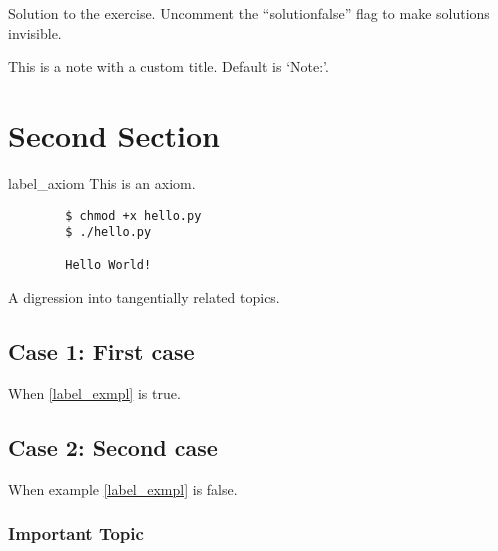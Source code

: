 \documentclass{worksheet}
\begin{document}
    
    \begin{solution}
    Solution to the exercise. Uncomment the ``solutionfalse'' flag to make solutions invisible.
    \end{solution}
    
    
    \begin{note}
	This is a note with a custom title. Default is `Note:'.
	\end{note}
	

    
	\section{Second Section}
	
	\begin{axiom}{label_axiom}
	This is an axiom.
	\end{axiom}
	
	
	
    \begin{code}[Code:]
    \begin{verbatim}
    	$ chmod +x hello.py
    	$ ./hello.py
    	
    	Hello World!
    \end{verbatim}
    \end{code}
	
	\begin{digression}
	    A digression into tangentially related topics.
	\end{digression}
    
    
    
    \subsection{Case 1: First case}
    When  \cref{label_exmpl} is true.
    \begin{warning}[A Warning:] %
     \lipsum[1][1-2]
    \end{warning}
    
    \subsection{Case 2: Second case}
    When example \ref{label_exmpl} is false.
        
        \subsubsection{Important Topic}
        \lipsum[2]
	
\end{document}
